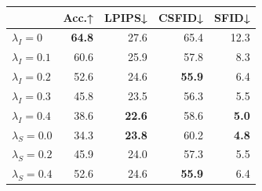 \begin{table}[H]
\center
\begin{tabular}{lrrrr}
\toprule
 & \textbf{Acc.↑} & \textbf{LPIPS↓} & \textbf{CSFID↓} & \textbf{SFID↓} \\
\midrule
                   $\lambda_I=0$ & \textbf{64.8} &   27.6 &   65.4 & 12.3 \\
                   $\lambda_I=0.1$ & 60.6 &   25.9 &   57.8 &  8.3 \\
                     
                    \rowcolor{LightGrey} $\lambda_I=0.2$   & 52.6 &   24.6 &   \textbf{55.9} &  6.4 \\
                   $\lambda_I=0.3$ & 45.8 &   23.5 &   56.3 &  5.5 \\
                   $\lambda_I=0.4$ & 38.6 &   \textbf{22.6} &   58.6 &  \textbf{5.0} \\
                   \midrule
                   $\lambda_S=0.0$ & 34.3 &   \textbf{23.8} &   60.2 &  \textbf{4.8} \\
                  $\lambda_S=0.2$ & 45.9 &   24.0 &   57.3 &  5.5 \\
                  \rowcolor{LightGrey} $\lambda_S=0.4$   & 52.6 &   24.6 &   \textbf{55.9} &  6.4 \\
                  

\end{tabular}
\end{table}

